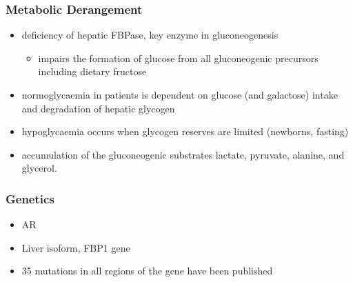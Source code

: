 \documentclass{scrartcl}
\begin{document}
\subsubsection{Metabolic Derangement}
\label{sec:orgb946092}
\begin{itemize}
\item deficiency of hepatic FBPase, key enzyme in gluconeogenesis
\begin{itemize}
\item impairs the formation of glucose from all gluconeogenic precursors including dietary fructose
\end{itemize}
\item normoglycaemia in patients is dependent on glucose (and galactose)
intake and degradation of hepatic glycogen
\item hypoglycaemia occurs when glycogen reserves are limited (newborns, fasting)
\item accumulation of the gluconeogenic substrates lactate, pyruvate, alanine, and glycerol.
\end{itemize}
\subsubsection{Genetics}
\label{sec:org7358ee6}
\begin{itemize}
\item AR
\item Liver isoform, FBP1 gene
\item 35 mutations in all regions of the gene have been published
\end{itemize}
\end{document}
